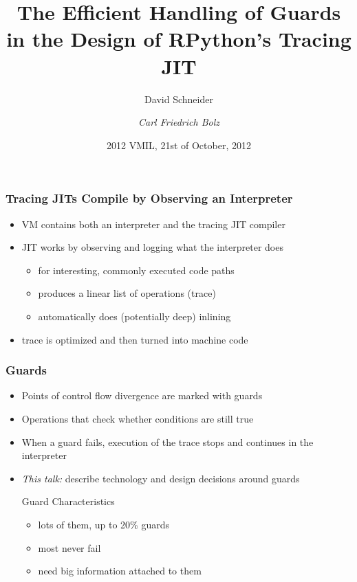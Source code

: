 \documentclass[utf8x]{beamer}
\title{The Efficient Handling of Guards in the Design of RPython's Tracing JIT}
\author[David Schneider, Carl Friedrich Bolz]{David Schneider \and \emph{Carl Friedrich Bolz}}
\institute[Heinrich-Heine-Universität Düsseldorf]{
Heinrich-Heine-Universität Düsseldorf, STUPS Group, Germany
}
\date{2012 VMIL, 21st of October, 2012}
\begin{document}
\begin{frame}
  \titlepage
\end{frame}


\begin{frame}
  \frametitle{Tracing JITs Compile by Observing an Interpreter}
  \begin{itemize}
      \item VM contains both an interpreter and the tracing JIT compiler
      \item JIT works by observing and logging what the interpreter does
      \begin{itemize}
          \item for interesting, commonly executed code paths
          \item produces a linear list of operations (trace)
          \item automatically does (potentially deep) inlining
      \end{itemize}
      \item trace is optimized and then turned into machine code
  \end{itemize}
\end{frame}

\begin{frame}
  \frametitle{Guards}
  \begin{itemize}
      \item Points of control flow divergence are marked with guards
      \item Operations that check whether conditions are still true
      \item When a guard fails, execution of the trace stops and continues in the interpreter
      \pause
      \item \emph{This talk:} describe technology and design decisions around guards
      \pause
      \begin{block}{Guard Characteristics}
          \begin{itemize}
              \item lots of them, up to 20\% guards
              \item most never fail
              \item need big information attached to them
          \end{itemize}
      \end{block}
  \end{itemize}
\end{frame}
\end{document}
